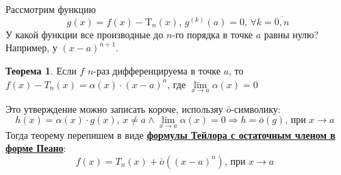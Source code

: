 \documentclass[12pt]{article}
\newcommand{\MT}{\mathrm{T}}
\theoremstyle{definition}
\newtheorem{theorem}{Теорема}
\begin{document}
Рассмотрим функцию $$g(x) = f(x) - \MT_n(x), \, g^{(k)}(a) = 0, \, \forall k = \overline{0,n}$$ 
У какой функции все производные до $n$-го порядка в точке $a$ равны нулю? Например, у $(x-a)^{n+1}$.

\begin{theorem}
	Если $f$ $n$-раз дифференцируема в точке $a$, то $f(x) - T_n(x) = \alpha(x){\cdot}(x-a)^n$, где $\lim\limits_{x \to a} \alpha(x) = 0$
\end{theorem}

Это утверждение можно записать короче, использяу $\bar{o}$-символику:
$$h(x) = \alpha(x){\cdot}g(x), \, x\neq a \wedge \lim\limits_{x\to a} \alpha(x) = 0 \Rightarrow h = \bar{o}(g) \text{, при $x \to a$ }$$
Тогда теорему перепишем в виде \uline{\textbf{формулы Тейлора с остаточным членом в форме Пеано}}:
$$f(x) = T_n(x) +  \bar{o}((x-a)^n) \text{, при $x \to a$ }$$
\end{document}
